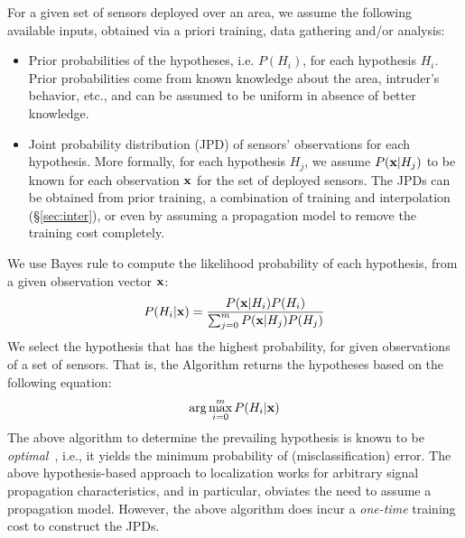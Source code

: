  For a given set of sensors deployed over an area, we
assume the following available inputs, obtained via a priori training,
data gathering and/or analysis:
\begin{itemize}
\item
Prior probabilities of the hypotheses, i.e. $P(H_i)$, for each
hypothesis $H_i$. Prior probabilities come from known knowledge about
the area, intruder's behavior, etc., and can be assumed to be uniform in
absence of better knowledge.

\item
Joint probability distribution (JPD) of sensors' observations for each
hypothesis. More formally, for each hypothesis $H_j$, we assume
$P(\mathbf{x}|H_j)$ to be known for each observation $\mathbf{x}$ for the set of
deployed sensors.  The JPDs can be obtained from prior training, a
combination of training and interpolation (\S\ref{sec:inter}), or
even by assuming a propagation model to remove the training
cost completely.
\end{itemize}

  We use
Bayes rule to compute the likelihood probability of each hypothesis,
from a given observation vector $\mathbf{x}$:
\begin{equation}
  P(H_i | \mathbf{x}) = \frac{P(\mathbf{x}| H_i)P(H_i)}{\sum_{j=0}^m P(\mathbf{x}|H_j)P(H_j)}
  \label{eqn:bayes}
\end{equation}
We select the hypothesis that has the highest probability, for given
observations of a set of sensors. That is, the \mll Algorithm returns
the hypotheses based on the following equation:
\begin{equation}
  \arg \max_{i=0}^m P(H_i | \mathbf{x})
  \label{eqn:map}
\end{equation}
The above \mll algorithm to determine the prevailing hypothesis is
known to be {\em optimal}~\cite{map-optimal}, i.e., it yields the minimum
probability of (misclassification) error. The above hypothesis-based
approach to localization works for arbitrary signal propagation
characteristics, and in particular, obviates the need to assume a
propagation model. However, the above \mll algorithm does incur a {\em
  one-time} training cost to construct the JPDs.



